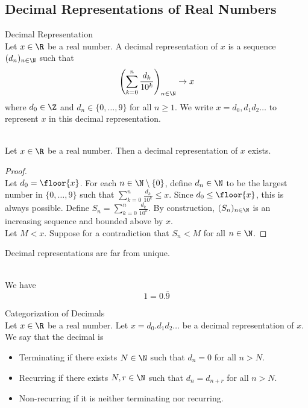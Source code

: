 \documentclass[a4paper]{article}
\begin{document}
\subsection{Decimal Representations of Real Numbers}
\begin{defn}{Decimal Representation}{}\\
Let $x\in\R$ be a real number. A decimal representation of $x$ is a sequence $(d_n)_{n\in\N}$ such that $$\left(\sum_{k=0}^n\frac{d_k}{10^k}\right)_{n\in\N}\to x$$ where $d_0\in\Z$ and $d_n\in\{0,\dots,9\}$ for all $n\geq 1$. We write $x=d_0,d_1d_2\dots$ to represent $x$ in this decimal representation. 
\end{defn}

\begin{lmm}{}{}\\
Let $x\in\R$ be a real number. Then a decimal representation of $x$ exists. 
\begin{proof}\\
Let $d_0=\floor{x}$. For each $n\in\N\setminus\{0\}$, define $d_n\in\N$ to be the largest number in $\{0,\dots,9\}$ such that $\sum_{k=0}^n\frac{d_k}{10^k}\leq x$. Since $d_0\leq\floor{x}$, this is always possible. Define $S_n=\sum_{k=0}^n\frac{d_k}{10^k}$. By construction, $(S_n)_{n\in\N}$ is an increasing sequence and bounded above by $x$. \\

Let $M<x$. Suppose for a contradiction that $S_n<M$ for all $n\in\N$. 
\end{proof}
\end{lmm}

Decimal representations are far from unique. 

\begin{eg}{}{}\\
We have $$1=0.\overline{9}$$
\end{eg}

\begin{defn}{Categorization of Decimals}{}\\
Let $x\in\R$ be a real number. Let $x=d_0.d_1d_2\dots$ be a decimal representation of $x$. We say that the decimal is 
\begin{itemize}
\item Terminating if there exists $N\in\N$ such that $d_n=0$ for all $n>N$. 
\item Recurring if there exists $N,r\in\N$ such that $d_n=d_{n+r}$ for all $n>N$. 
\item Non-recurring if it is neither terminating nor recurring. 
\end{itemize}
\end{defn}
\end{document}
